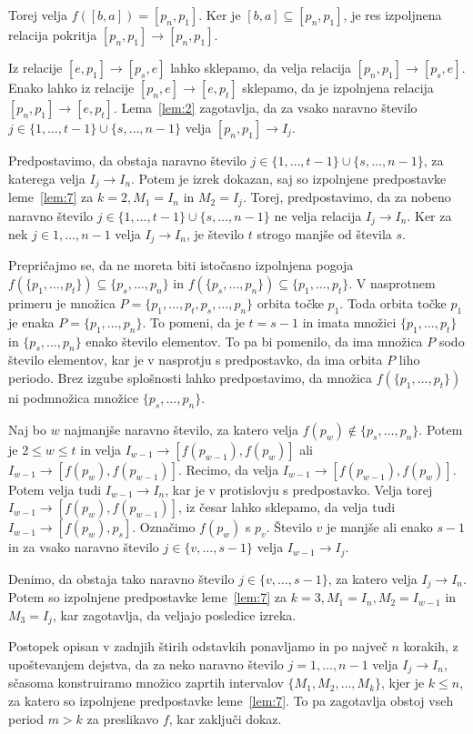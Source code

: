 \documentclass[../TG_magistrsko_delo_sections.tex]{subfiles}
\begin{document}
\begin{dokaz}
Torej velja $f([b, a]) = [p_n, p_1]$. Ker je $[b, a] \subseteq [p_n, p_1]$, je res izpoljnena relacija pokritja $[p_n, p_1] \to [p_n, p_1]$.

Iz relacije $[e, p_1] \to [p_s, e]$ lahko sklepamo, da velja relacija $[p_n, p_1] \to [p_s, e]$. Enako lahko iz relacije $[p_n, e] \to [e, p_t]$ sklepamo, da je izpolnjena relacija $[p_n, p_1] \to [e, p_t]$. Lema~\ref{lem:2} zagotavlja, da za vsako naravno število $j \in \{1, \dots, t-1\} \cup \{s, \dots, n-1\}$ velja $[p_n, p_1] \to I_j$.

Predpostavimo, da obstaja naravno število $j \in \{1, \dots, t-1\} \cup \{s, \dots, n-1\}$, za katerega velja $I_j \to I_n$. Potem je izrek dokazan, saj so izpolnjene predpostavke leme~\ref{lem:7} za $k=2, M_1 = I_n$ in $M_2=I_j$. Torej, predpostavimo, da za nobeno naravno število $j \in \{1, \dots, t-1\} \cup \{s, \dots, n-1\}$ ne velja relacija $I_j \to I_n$. Ker za nek $j \in {1, \dots, n-1}$ velja $I_j \to I_n$, je število $t$ strogo manjše od števila $s$.

Prepričajmo se, da ne moreta biti istočasno izpolnjena pogoja $f(\{p_1, \dots, p_t\}) \subseteq \{p_s, \dots, p_n\}$ in $f(\{p_s, \dots, p_n\}) \subseteq \{p_1, \dots, p_t\}$. V nasprotnem primeru je množica $P = \{p_1, \dots, p_t, p_s, \dots, p_n\}$ orbita točke $p_1$. Toda orbita točke $p_1$ je enaka $P = \{p_1, \dots, p_n\}$. To pomeni, da je $t = s-1$ in imata množici $\{p_1, \dots, p_t\}$ in $\{p_s, \dots, p_n\}$ enako število elementov. To pa bi pomenilo, da ima množica $P$ sodo število elementov, kar je v nasprotju s predpostavko, da ima orbita $P$ liho periodo. Brez izgube splošnosti lahko predpostavimo, da množica $f(\{p_1, \dots, p_t \})$ ni podmnožica množice $\{p_s, \dots, p_n\}$.

Naj bo $w$ najmanjše naravno število, za katero velja $f(p_w) \notin \{p_s, \dots, p_n\}$. Potem je $2 \leq w \leq t$ in velja $I_{w-1} \to [f(p_{w-1}), f(p_w)]$ ali $I_{w-1} \to [f(p_w), f(p_{w-1})]$. Recimo, da velja $I_{w-1} \to [f(p_{w-1}), f(p_w)]$. Potem velja tudi $I_{w-1} \to I_n$, kar je v protislovju s predpostavko. Velja torej $I_{w-1} \to [f(p_w), f(p_{w-1})]$, iz česar lahko sklepamo, da velja tudi $I_{w-1} \to [f(p_w), p_s]$. Označimo $f(p_w)$ s $p_v$. Število $v$ je manjše ali enako $s-1$ in za vsako naravno število $j \in \{v, \dots, s-1 \}$ velja $I_{w-1} \to I_j$.

Denimo, da obstaja tako naravno število $j \in \{v, \dots, s-1 \}$, za katero velja $I_j \to I_n$. Potem so izpolnjene predpostavke leme~\ref{lem:7} za $k=3, M_1 = I_n, M_2 = I_{w-1}$ in $M_3 = I_j$, kar zagotavlja, da veljajo posledice izreka.

Postopek opisan v zadnjih štirih odstavkih ponavljamo in po največ $n$ korakih, z upoštevanjem dejstva, da za neko naravno število $j = 1, \dots, n-1$ velja $I_j \to I_n$, sčasoma konstruiramo množico zaprtih intervalov $\{M_1, M_2, \dots, M_k\}$, kjer je $k \leq n$, za katero so izpolnjene predpostavke leme~\ref{lem:7}. To pa zagotavlja obstoj vseh period $m > k$ za preslikavo $f$, kar zaključi dokaz.
\end{dokaz}
\end{document}
